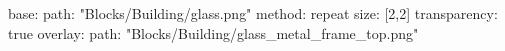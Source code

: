 base:
  path: "Blocks/Building/glass.png"
  method: repeat
  size: [2,2]
  transparency: true
overlay:
  path: "Blocks/Building/glass_metal_frame_top.png"